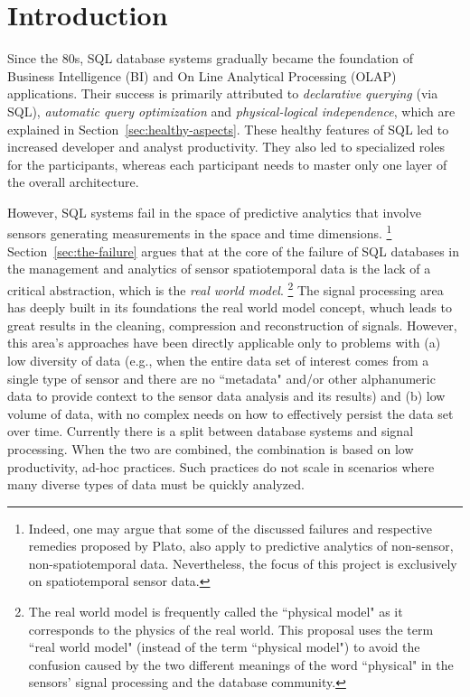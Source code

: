 
\section{Introduction}
\label{sec:introduction}
Since the 80s, SQL database systems gradually became the foundation of Business Intelligence (BI) and On Line Analytical Processing (OLAP) applications. Their success is primarily attributed to {\em declarative querying} (via SQL), {\em automatic query optimization} and {\em physical-logical independence}, which are explained in Section~\ref{sec:healthy-aspects}. These healthy features of SQL led to increased developer and analyst productivity. They also led to specialized roles for the participants, whereas each participant needs to master only one layer of the overall architecture. 

However, SQL systems fail in the space of predictive analytics that involve sensors generating measurements in the space and time dimensions.%
\footnote{Indeed, one may argue that some of the discussed failures and respective remedies proposed by Plato, also apply to predictive analytics of non-sensor, non-spatiotemporal data. Nevertheless, the focus of this project is exclusively on spatiotemporal sensor data.
}
Section~\ref{sec:the-failure} argues that at the core of the failure of SQL databases in the management and analytics of sensor spatiotemporal data is the lack of a critical abstraction, which is the {\em real world model}.%
\footnote{The real world model is frequently called the ``physical model" as it corresponds to the physics of the real world. This proposal uses the term ``real world model" (instead of the term ``physical model") to avoid the confusion caused by the two different meanings of the word ``physical" in the sensors' signal processing and the database community.
}
The signal processing area has deeply built in its foundations the real world model concept, whuch leads to great results in the cleaning, compression and reconstruction of signals. However, this area's approaches have been directly applicable only to problems with (a) low diversity of data (e.g., when the entire data set of interest comes from a single type of sensor and there are no ``metadata" and/or other alphanumeric data to provide context to the sensor data analysis and its results) and (b) low volume of data, with no complex needs on how to effectively persist the data set over time. 
Currently there is a split between database systems and signal processing. When the two are combined, the combination is based on low productivity, ad-hoc practices. Such practices do not scale in scenarios where many diverse types of data must be quickly analyzed. 

